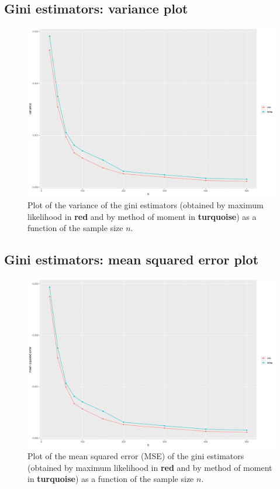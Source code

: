 \subsection{Gini estimators: variance plot}

\begin{figure}[H]
  \centering
  \includegraphics[width=\linewidth]{figures/png/gini_var_plot.png}
  \caption{Plot of the variance of the gini estimators (obtained by maximum likelihood in \textbf{red} and by method of moment in \textbf{turquoise}) as a function of the sample size $n$.}
  \label{fig:gini-estiamtors-variance-plot}
\end{figure}

\subsection{Gini estimators: mean squared error plot}

\begin{figure}[H]
  \centering
  \includegraphics[width=\linewidth]{figures/png/gini_mse_plot.png}
  \caption{Plot of the mean squared error (MSE) of the gini estimators (obtained by maximum likelihood in \textbf{red} and by method of moment in \textbf{turquoise}) as a function of the sample size $n$.}
  \label{fig:gini-estimators-mse-plot}
\end{figure}

